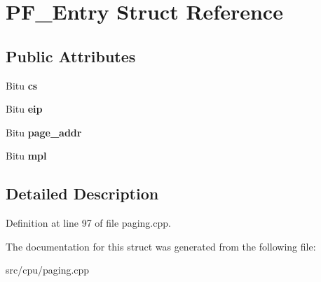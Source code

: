\hypertarget{structPF__Entry}{\section{P\-F\-\_\-\-Entry Struct Reference}
\label{structPF__Entry}
}
\subsection*{Public Attributes}
\begin{DoxyCompactItemize}
\item 
\hypertarget{structPF__Entry_a672785d3e995d1c6cf6ebcd15831bef4}{Bitu {\bfseries cs}}\label{structPF__Entry_a672785d3e995d1c6cf6ebcd15831bef4}

\item 
\hypertarget{structPF__Entry_aeb74cf66f0b6f1a98cf0a68cd907fd86}{Bitu {\bfseries eip}}\label{structPF__Entry_aeb74cf66f0b6f1a98cf0a68cd907fd86}

\item 
\hypertarget{structPF__Entry_a915cb9baa86765995e0ad5e26de97b69}{Bitu {\bfseries page\-\_\-addr}}\label{structPF__Entry_a915cb9baa86765995e0ad5e26de97b69}

\item 
\hypertarget{structPF__Entry_a4ad6c19d3d479c81d988e15edd9e595c}{Bitu {\bfseries mpl}}\label{structPF__Entry_a4ad6c19d3d479c81d988e15edd9e595c}

\end{DoxyCompactItemize}


\subsection{Detailed Description}


Definition at line 97 of file paging.\-cpp.



The documentation for this struct was generated from the following file\-:\begin{DoxyCompactItemize}
\item 
src/cpu/paging.\-cpp\end{DoxyCompactItemize}

